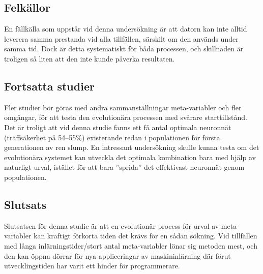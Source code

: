 \documentclass[a4paper, 12pt]{article}
\begin{document}
  \subsection{Felkällor}

  En fällkälla som uppstår vid denna undersökning är att datorn kan inte alltid leverera samma prestanda vid alla tillfällen, särskilt om den används under samma tid. Dock är detta systematiskt för båda processen, och skillnaden är troligen så liten att den inte kunde påverka resultaten.

  \subsection{Fortsatta studier}

  Fler studier bör göras med andra sammanställningar meta-variabler och fler omgångar, för att testa den evolutionära processen med svårare starttillstånd. Det är troligt att vid denna studie fanns ett få antal optimala neuronnät (träffsäkerhet på 54–55\%) existerande redan i populationen för första generationen av ren slump. En intressant undersökning skulle kunna testa om det evolutionära systemet kan utveckla det optimala kombination bara med hjälp av naturligt urval, istället för att bara ”sprida” det effektivast neuronnät genom populationen.

  \subsection{Slutsats}

  Slutsatsen för denna studie är att en evolutionär process för urval av meta-variabler kan kraftigt förkorta tiden det krävs för en sådan sökning. Vid tillfällen med långa inlärningstider/stort antal meta-variabler lönar sig metoden mest, och den kan öppna dörrar för nya appliceringar av maskininlärning där förut utvecklingstiden har varit ett hinder för programmerare.


\printbibliography
\end{document}
